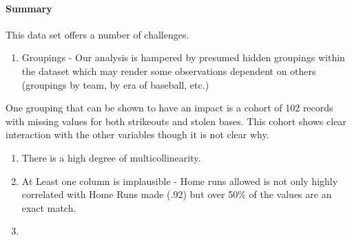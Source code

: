 \documentclass[
]{article}
\providecommand{\tightlist}{%
  \setlength{\itemsep}{0pt}\setlength{\parskip}{0pt}}
\begin{document}
\hypertarget{summary}{%
\paragraph{Summary}\label{summary}}

This data set offers a number of challenges.

\begin{enumerate}
\def\labelenumi{\arabic{enumi}.}
\tightlist
\item
  Groupings - Our analysis is hampered by presumed hidden groupings
  within the dataset which may render some observations dependent on
  others (groupings by team, by era of baseball, etc.)
\end{enumerate}

One grouping that can be shown to have an impact is a cohort of 102
records with missing values for both strikeouts and stolen bases. This
cohort shows clear interaction with the other variables though it is not
clear why.

\begin{enumerate}
\def\labelenumi{\arabic{enumi}.}
\setcounter{enumi}{1}
\item
  There is a high degree of multicollinearity.
\item
  At Least one column is implausible - Home runs allowed is not only
  highly correlated with Home Runs made (.92) but over 50\% of the
  values are an exact match.
\item
\end{enumerate}
\end{document}
